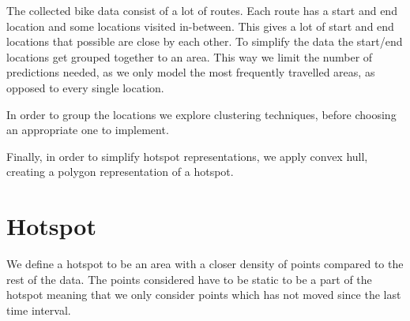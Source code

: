 The collected bike data consist of a lot of routes.
Each route has a start and end location and some locations visited in-between.
This gives a lot of start and end locations that possible are close by each other.
To simplify the data the start/end locations get grouped together to an area.
This way we limit the number of predictions needed, as we only model the most frequently travelled areas, as opposed to every single location.

In order to group the locations we explore clustering techniques, before choosing an appropriate one to implement.

Finally, in order to simplify hotspot representations, we apply convex hull, creating a polygon representation of a hotspot.

\section{Hotspot}\label{hotspot}
We define a hotspot to be an area with a closer density of points compared to the rest of the data.
The points considered have to be static to be a part of the hotspot meaning that we only consider points which has not moved since the last time interval.
